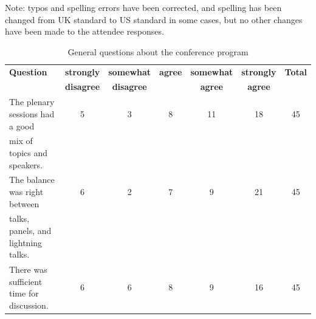 Note: typos and spelling errors have been corrected, and spelling has been changed from UK standard to US standard in some cases, but no other changes have been made to the attendee responses.



\begin{table}[h!]
\centering
\caption{General questions about the conference program}
\label{tab:survey_program}
{\scriptsize
\begin{tabular}{|l|cccccc|}
\hline
{\bf Question} &
{\bf strongly} &
{\bf somewhat}  &
{\bf agree} &
{\bf somewhat}  &
{\bf strongly}  &
{\bf Total} \\
&
{\bf disagree} &
{\bf disagree} &
&
{\bf agree} &
{\bf agree} &
\\ \hline
The plenary sessions had a good&
5 &
3 &
8 &
11 &
18 &
45 \\
\hspace{.2cm}mix of topics and speakers. &
 &
 &
 &
 &
 &
 \\
The balance was right between  &
6 &
2 &
7 &
9 &
21 &
45 \\
\hspace{.2cm}talks, panels, and lightning talks. &
&
 &
 &
 &
 &
 \\
There was sufficient time for discussion. &
6 &
6 &
8 &
9 &
16 &
45 \\
\hline
\end{tabular}
}
\end{table}



